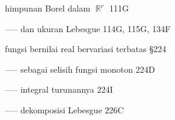 \indexmedskip


























































































himpunan Borel dalam $\BbbR^r$ 111G

----- dan ukuran Lebesgue 114G, 115G, 134F

 fungsi bernilai real bervariasi terbatas \S224

----- sebagai selisih fungsi monoton 224D

----- integral turunannya 224I

----- dekomposisi Lebesgue 226C

























